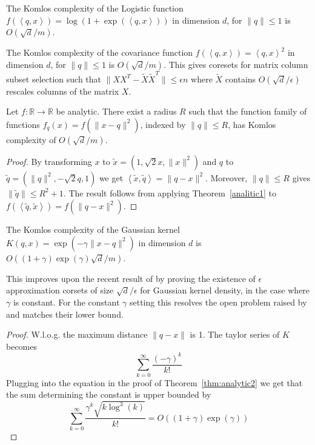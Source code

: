 \documentclass[anon,12pt]{colt2019} %
\newcommand{\ip}[1]{\left \langle #1 \right \rangle}
\newcommand{\R}{\mathbb{R}}
\newcommand{\eps}{\epsilon}
\begin{document}
\begin{corollary}
The Komlos complexity of the Logistic function $f(\ip{q,x}) = \log(1+\exp(\ip{q,x}))$ in dimension $d$, for $\|q\| \leq 1$ is $O(\sqrt{d}/m)$.
\end{corollary}

\begin{corollary}
The Komlos complexity of the covariance function $f(\ip{q,x}) = \ip{q,x}^2$ in dimension $d$, for $\|q\| \leq 1$ is $O(\sqrt{d}/m)$. This gives coresets for matrix column subset selection such that $\|XX^T - \tilde X \tilde X^T\| \le \eps n$ where $\tilde X$ contains $O(\sqrt{d}/\eps)$ rescales columns of the matrix $X$.
\end{corollary}



\begin{theorem} \label{thm:analytic2}
Let $f:\R\rightarrow\R$ be analytic. There exist a radius $R$ such that the function family of functions $f_q(x) = f(\|x-q\|^2)$, indexed by $\|q\| \leq R$, has Komlos complexity of $O(\sqrt{d}/m)$. 
\end{theorem}
\begin{proof}
By transforming $x$ to $\tilde{x} = (1, \sqrt{2}x, \|x\|^2)$ and $q$ to $\tilde{q} = (\|q\|^2, -\sqrt{2}q, 1)$ we get $\ip{\tilde{x},\tilde{q}} = \|q-x\|^2$. Moreover, $\|q\| \le R$ gives $\|\tilde q\| \le R^2+1$. The result follows from applying Theorem~\ref{analitic1} to $f(\ip{ \tilde q, \tilde x}) = f(\|q-x\|^2)$.
\end{proof}

\begin{corollary}
The Komlos complexity of the Gaussian kernel $K(q,x) = \exp(-\gamma \|x-q\|^2)$ in dimension $d$ is $O((1+\gamma)\exp(\gamma)\sqrt{d}/m)$.
\end{corollary} 
This improves upon the recent result of \cite{DBLP:journals/corr/abs-1802-01751} by proving the existence of $\eps$ approximation corsets of size $\sqrt{d}/\eps$ for Gaussian kernel density, in the case where $\gamma$ is constant. For the constant $\gamma$ setting this resolves the open problem raised by \cite{DBLP:journals/corr/abs-1802-01751} and matches their lower bound.   

\begin{proof}
W.l.o.g. the maximum distance $\|q-x\|$ is 1. The taylor series of $K$ becomes
$$ \sum_{k=0}^\infty \frac{(-\gamma)^k}{k!} $$
Plugging into the equation in the proof of Theorem~\ref{thm:analytic2} we get that the sum determining the constant is upper bounded by
$$ \sum_{k=0}^\infty \frac{\gamma^{k}\sqrt{ k\log^3(k)}}{k!} = O\left((1+\gamma) \exp(\gamma)\right)$$
\end{proof}
\end{document}

